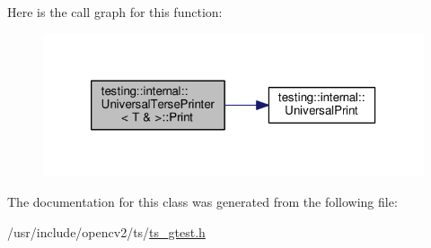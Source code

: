 Here is the call graph for this function\-:\nopagebreak
\begin{figure}[H]
\begin{center}
\leavevmode
\includegraphics[width=318pt]{classtesting_1_1internal_1_1UniversalTersePrinter_3_01T_01_6_01_4_a5f0d2e50bb18c00d019389fca869b9d0_cgraph}
\end{center}
\end{figure}




The documentation for this class was generated from the following file\-:\begin{DoxyCompactItemize}
\item 
/usr/include/opencv2/ts/\hyperlink{ts__gtest_8h}{ts\-\_\-gtest.\-h}\end{DoxyCompactItemize}
